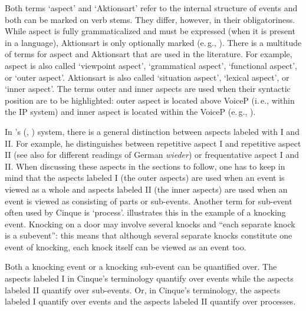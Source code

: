 Both terms `aspect' and `Aktionsart' refer to the internal structure of events and both can be marked on verb stems. They differ, however, in their obligatoriness. While aspect is fully grammaticalized and must be expressed (when it is present in a language), Aktionsart is only optionally marked (e.\,g., \citealt[170]{binnick1991time}). There is a multitude of terms for aspect and Aktionsart that are used in the literature. For example, aspect is also called `viewpoint aspect', `grammatical aspect', `functional aspect', or `outer aspect'. Aktionsart is also called `situation aspect', `lexical aspect', or `inner aspect'. The terms outer and inner aspects are used when their syntactic position are to be highlighted: outer aspect is located above VoiceP (i.\,e., within the IP system) and inner aspect is located within the VoiceP (e.\,g., \citealt{macdonald2008syntactic, travis2010aspect}).

In \citeauthor{cinque1999adverbs}'s (\citeyear{cinque1999adverbs}, \citeyear{cinque2006restructuring}) system, there is a general distinction between aspects labeled with I and II. For example, he distinguishes between repetitive aspect I and repetitive aspect II (see also \citealt{stechow1996different} for different readings of German \textit{wieder}) or frequentative aspect I and II. When discussing these aspects in the sections to follow, one has to keep in mind that the aspects labeled I (the outer aspects) are used when an event is viewed as a whole and aspects labeled II (the inner aspects) are used when an event is viewed as consisting of parts or sub-events. Another term for sub-event often used by Cinque is `process'. \citet[189]{binnick1991time} illustrates this in the example of a knocking event. Knocking on a door may involve several knocks and ``each separate knock is a subevent'': this means that although several separate knocks constitute one event of knocking, each knock itself can be viewed as an event too. 

Both a knocking event or a knocking sub-event can be quantified over. The aspects labeled I in Cinque's terminology quantify over events while the aspects labeled II quantify over sub-events. Or, in Cinque's terminology, the aspects labeled I quantify over events and the aspects labeled II quantify over processes.


